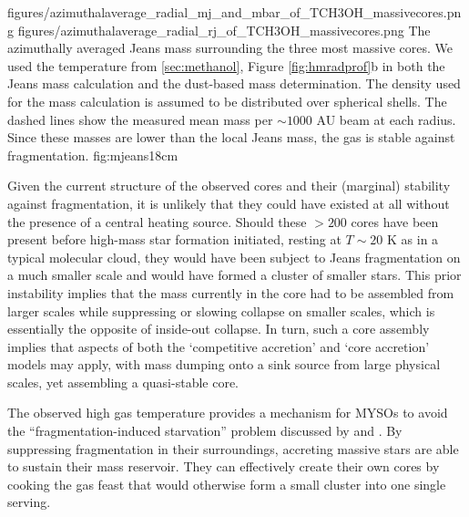 \documentclass{emulateapj}
\begin{document}

\FigureTwo
{figures/azimuthalaverage_radial_mj_and_mbar_of_TCH3OH_massivecores.png}
{figures/azimuthalaverage_radial_rj_of_TCH3OH_massivecores.png}
{The azimuthally averaged Jeans mass surrounding the
three most massive cores.  We used the \methanol temperature from
\ref{sec:methanol}, Figure \ref{fig:hmradprof}b in both the Jeans mass
calculation and the dust-based mass determination.
The density used for the mass calculation is assumed to be distributed
over spherical shells.  The dashed lines show the measured mean mass per
$\sim1000$ AU beam at each radius.  Since these masses are lower than
the local Jeans mass, the gas is stable against fragmentation.
}
{fig:mjeans}{1}{8cm}



Given the current structure of the observed cores and their (marginal) stability
against fragmentation, it is unlikely that they could have existed at
all without the presence of a central heating source.  Should these $>200$
\msun cores have been present before high-mass star formation initiated,
resting at $T\sim20$ K as in a typical molecular cloud, they would have been
subject to Jeans fragmentation on a much smaller scale and would have formed a
cluster of smaller stars.  This prior instability implies that the mass
currently in the core had
to be assembled from larger scales while suppressing or slowing collapse on
smaller scales, which is essentially the opposite of inside-out collapse.
In turn, such a core assembly implies that aspects of both the `competitive accretion'
and `core accretion' models may apply, with mass dumping onto a sink source from large
physical scales, yet assembling a quasi-stable core.

The observed high gas temperature provides a mechanism for MYSOs to avoid the
``fragmentation-induced starvation'' problem discussed by
\citet{Peters2010a,Peters2010c} and \citet{Girichidis2012b}.  By suppressing
fragmentation in their surroundings, accreting massive stars are able to
sustain their mass reservoir.  They can effectively create their own cores by
cooking the gas feast that would otherwise form a small cluster into one single
serving.
\end{document}

